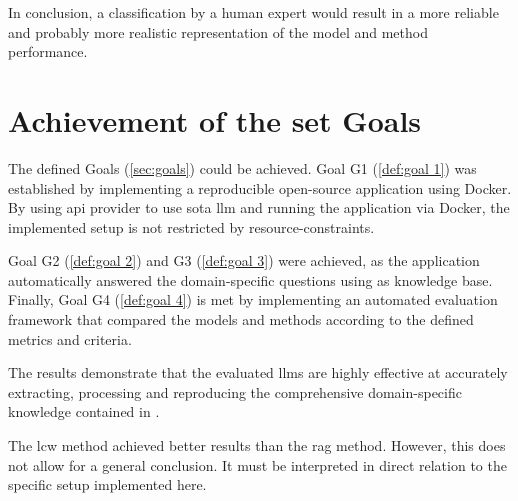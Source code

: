 In conclusion, a classification by a human expert would result in a more reliable and probably more realistic representation of the model and method performance.

\section{Achievement of the set Goals}

The defined Goals (\cref{sec:goals}) could be achieved.
Goal G1 (\cref{def:goal 1}) was established by implementing a reproducible open-source application using Docker.
By using \ac{api} provider to use \ac{sota} \ac{llm} and running the application via Docker, the implemented setup is not restricted by resource-constraints.

Goal G2 (\cref{def:goal 2}) and G3 (\cref{def:goal 3}) were achieved, as the application automatically answered the domain-specific questions using \citet{bb2}
as knowledge base.
Finally, Goal G4 (\cref{def:goal 4}) is met by implementing an automated evaluation framework that compared the models and methods according to the defined metrics and criteria.

The results demonstrate that the evaluated \acp{llm} are highly effective at accurately extracting, processing and reproducing the comprehensive domain-specific knowledge contained in \citet{bb2}.

The \ac{lcw} method achieved better results than the \ac{rag} method.
However, this does not allow for a general conclusion.
It must be interpreted in direct relation to the specific setup implemented here.

